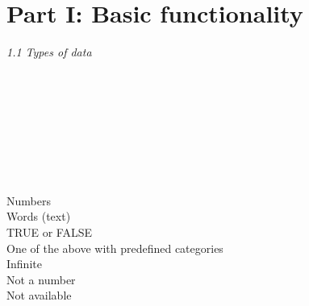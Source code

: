 \section{Part I: Basic functionality}

\textit{1.1 Types of data} \\
\\
\begin{minipage}[t]{.4\textwidth}
\vspace*{-8pt}
 \\
 \\
 \\
 \\ 			
 \\					
 \\ 					 
\end{minipage}
\begin{minipage}[t]{.6\textwidth}
Numbers \\
Words (text) \\
TRUE or FALSE \\
One of the above with predefined categories \\
Infinite \\
Not a number \\
Not available
\end{minipage}
\vspace*{.5cm}


